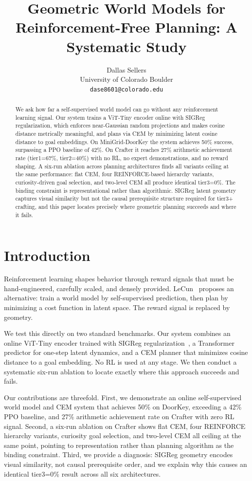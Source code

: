 \documentclass[12pt]{article}
\title{Geometric World Models for Reinforcement-Free Planning: A Systematic Study}
\author{%
  Dallas Sellers \\
  University of Colorado Boulder \\
  \texttt{dase8601@colorado.edu} \\
}
\begin{document}
\maketitle

\begin{abstract}
We ask how far a self-supervised world model can go without any reinforcement learning signal. Our system trains a ViT-Tiny encoder online with SIGReg regularization, which enforces near-Gaussian random projections and makes cosine distance metrically meaningful, and plans via CEM by minimizing latent cosine distance to goal embeddings. On MiniGrid-DoorKey the system achieves 50\% success, surpassing a PPO baseline of 42\%. On Crafter it reaches 27\% arithmetic achievement rate (tier1=67\%, tier2=40\%) with no RL, no expert demonstrations, and no reward shaping. A six-run ablation across planning architectures finds all variants ceiling at the same performance: flat CEM, four REINFORCE-based hierarchy variants, curiosity-driven goal selection, and two-level CEM all produce identical tier3=0\%. The binding constraint is representational rather than algorithmic. SIGReg latent geometry captures visual similarity but not the causal prerequisite structure required for tier3+ crafting, and this paper locates precisely where geometric planning succeeds and where it fails.
\end{abstract}

\section{Introduction}

Reinforcement learning shapes behavior through reward signals that must be hand-engineered, carefully scaled, and densely provided. LeCun~\cite{lecun2022path} proposes an alternative: train a world model by self-supervised prediction, then plan by minimizing a cost function in latent space. The reward signal is replaced by geometry.

We test this directly on two standard benchmarks. Our system combines an online ViT-Tiny encoder trained with SIGReg regularization~\cite{yarats2025lewm}, a Transformer predictor for one-step latent dynamics, and a CEM planner that minimizes cosine distance to a goal embedding. No RL is used at any stage. We then conduct a systematic six-run ablation to locate exactly where this approach succeeds and fails.

Our contributions are threefold. First, we demonstrate an online self-supervised world model and CEM system that achieves 50\% on DoorKey, exceeding a 42\% PPO baseline, and 27\% arithmetic achievement rate on Crafter with zero RL signal. Second, a six-run ablation on Crafter shows flat CEM, four REINFORCE hierarchy variants, curiosity goal selection, and two-level CEM all ceiling at the same point, pointing to representation rather than planning algorithm as the binding constraint. Third, we provide a diagnosis: SIGReg geometry encodes visual similarity, not causal prerequisite order, and we explain why this causes an identical tier3=0\% result across all six architectures.
\end{document}
